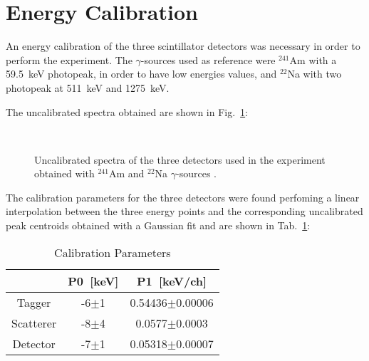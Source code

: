 \newpage
\section*{Energy Calibration}

An energy calibration of the three scintillator detectors was necessary in order to perform the experiment. The $\gamma$-sources used as reference were $^{241}$Am with a 59.5~keV photopeak, in order to have low energies values, and $^{22}$Na with two photopeak at 511~keV and 1275~keV.

The uncalibrated spectra obtained are shown in Fig.~\ref{Fig:Uncalibrated_spectra}:

\begin{figure}[h!]
	\centering
	 \quad
	 \quad
	 \quad
	 \quad
	 \quad
	 \\
	\caption{Uncalibrated spectra of the three detectors used in the experiment obtained with $^{241}$Am and $^{22}$Na $\gamma$-sources .}
	\label{Fig:Uncalibrated_spectra}
\end{figure}

The calibration parameters for the three detectors were found perfoming a linear interpolation between the three energy points and the corresponding uncalibrated peak centroids obtained with a Gaussian fit and are shown in Tab.~\ref{Tab:Calibration parameters}:

\begin{table}[H]
\centering
\begin{tabular}{c|cc}
\toprule
\toprule
 & P0~[keV] & P1~[keV/ch] \\
\midrule
Tagger & -6$\pm$1 &  0.54436$\pm$0.00006 \\
Scatterer & -8$\pm$4 & 0.0577$\pm$0.0003 \\
Detector & -7$\pm$1 & 0.05318$\pm$0.00007 \\
\bottomrule
\bottomrule
\end{tabular}
\caption{Calibration Parameters}
\label{Tab:Calibration parameters}
\end{table}